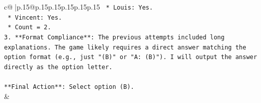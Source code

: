 \documentclass{article}
\begin{document}
{\begin{supertabular}{c@{$\;$}|p{.15\linewidth}@{}p{.15\linewidth}p{.15\linewidth}p{.15\linewidth}p{.15\linewidth}p{.15\linewidth}}
{{{\texttt{    *   Louis: Yes.} \\
\texttt{    *   Vincent: Yes.} \\
\texttt{    *   Count = 2.} \\
\texttt{3.  **Format Compliance**: The previous attempts included long explanations. The game likely requires a direct answer matching the option format (e.g., just "(B)" or "A: (B)"). I will output the answer directly as the option letter.} \\
\\ 
\texttt{**Final Action**: Select option (B).} \\
            }
        }
    }
    & \\ \\

\end{supertabular}
}
\end{document}
